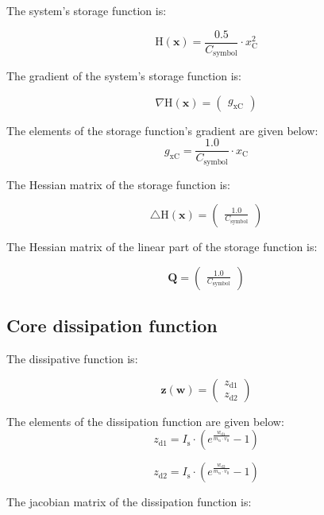 \documentclass[11pt, oneside]{article}      %
\begin{document}
The system's storage function is:


$$ \mathrm H(\mathbf{x}) = \frac{0.5}{C_{\mathrm{symbol}}} \cdot x_{\mathrm{C}}^{2}$$


The gradient of the system's storage function is:


$$ \nabla\mathrm H(\mathbf{x}) = \left(\begin{array}{c}g_{\mathrm{xC}}\end{array}\right)$$

The elements of the storage function's gradient are given below:
$$ g_{\mathrm{xC}} = \frac{1.0}{C_{\mathrm{symbol}}} \cdot x_{\mathrm{C}}$$
    

The Hessian matrix of the storage function is:


$$ \triangle\mathrm H(\mathbf x) = \left(\begin{array}{c}\frac{1.0}{C_{\mathrm{symbol}}}\end{array}\right)$$

%
%

The Hessian matrix of the linear part of the storage function is:


$$ \mathbf{Q} = \left(\begin{array}{c}\frac{1.0}{C_{\mathrm{symbol}}}\end{array}\right)$$

%
%


\subsection{Core dissipation function}

The dissipative function is:


$$ \mathbf z(\mathbf{w}) = \left(\begin{array}{c}z_{\mathrm{d1}}\\z_{\mathrm{d2}}\end{array}\right)$$

%
%

The elements of the dissipation function are given below:
$$ z_{\mathrm{d1}} = I_{\mathrm{s}} \cdot \left(e^{\frac{w_{\mathrm{d1}}}{m_{\mathrm{u}} \cdot v_{\mathrm{0}}}} - 1\right)$$

%
$$ z_{\mathrm{d2}} = I_{\mathrm{s}} \cdot \left(e^{\frac{w_{\mathrm{d2}}}{m_{\mathrm{u}} \cdot v_{\mathrm{0}}}} - 1\right)$$

%

The jacobian matrix of the dissipation function is:

%
\end{document}
